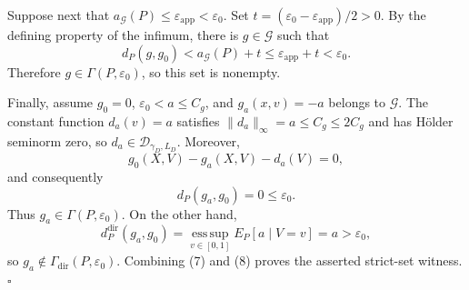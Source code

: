 Suppose next that \(a_{\mathcal G}(P)\le\varepsilon_{\mathrm{app}}<\varepsilon_0\). Set
\(t=(\varepsilon_0-\varepsilon_{\mathrm{app}})/2>0\). By the defining property of the infimum, there is \(g\in\mathcal G\) such that
\[
 d_P(g,g_0)<a_{\mathcal G}(P)+t
 \le\varepsilon_{\mathrm{app}}+t
 <\varepsilon_0. \tag{6}
\]
Therefore \(g\in\Gamma(P,\varepsilon_0)\), so this set is nonempty.

Finally, assume \(g_0=0\), \(\varepsilon_0<a\le C_g\), and \(g_a(x,v)=-a\) belongs to \(\mathcal G\). The constant function \(d_a(v)=a\) satisfies \(\|d_a\|_\infty=a\le C_g\le2C_g\) and has H\"older seminorm zero, so \(d_a\in\mathcal D_{\gamma_D,L_D}\). Moreover,
\[
 g_0(X,V)-g_a(X,V)-d_a(V)=0,
\]
and consequently
\[
 d_P(g_a,g_0)=0\le\varepsilon_0. \tag{7}
\]
Thus \(g_a\in\Gamma(P,\varepsilon_0)\). On the other hand,
\[
 d_P^{\mathrm{dir}}(g_a,g_0)
 =\operatorname*{ess\,sup}_{v\in[0,1]}E_P[a\mid V=v]
 =a>\varepsilon_0, \tag{8}
\]
so \(g_a\notin\Gamma_{\mathrm{dir}}(P,\varepsilon_0)\). Combining (7) and (8) proves the asserted strict-set witness. \(\square\)